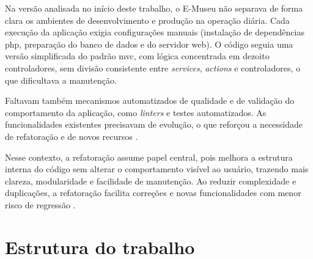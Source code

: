 Na versão analisada no início deste trabalho, o E-Museu não separava de forma clara os ambientes de desenvolvimento e produção na operação diária. Cada execução da aplicação exigia configurações manuais (instalação de dependências \acrshort{php}, preparação do banco de dados e do servidor web). O código seguia uma versão simplificada do padrão \acrfull{mvc}, com lógica concentrada em dezoito controladores, sem divisão consistente entre \textit{services}, \textit{actions} e controladores, o que dificultava a manutenção.

Faltavam também mecanismos automatizados de qualidade e de validação do comportamento da aplicação, como \textit{linters} e testes automatizados. As funcionalidades existentes precisavam de evolução, o que reforçou a necessidade de refatoração e de novos recursos \cite{importance:testing}. %


Nesse contexto, a refatoração assume papel central, pois melhora a estrutura interna do código sem alterar o comportamento visível ao usuário, trazendo mais clareza, modularidade e facilidade de manutenção. Ao reduzir complexidade e duplicações, a refatoração facilita correções e novas funcionalidades com menor risco de regressão \cite{refatoracao:2004}. %

\section{Estrutura do trabalho}\label{sec:estruturaTrabalho}

